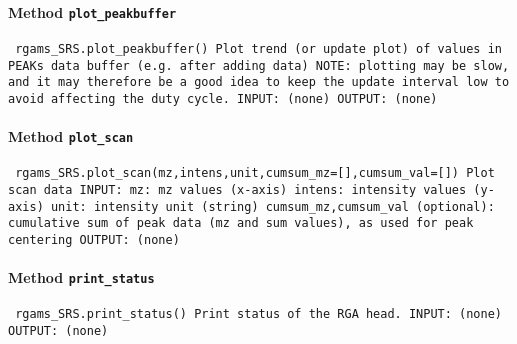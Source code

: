 \paragraph{Method \texttt{plot_peakbuffer}}
\vspace{1ex}
\texttt{\newline
rgams_SRS.plot_peakbuffer()\newline
\newline
Plot trend (or update plot) of values in PEAKs data buffer (e.g. after adding data)\newline
NOTE: plotting may be slow, and it may therefore be a good idea to keep the update interval low to avoid affecting the duty cycle.\newline
\newline
INPUT:\newline
(none)\newline
\newline
OUTPUT:\newline
(none)\newline
\newline
}

\paragraph{Method \texttt{plot_scan}}
\vspace{1ex}
\texttt{\newline
rgams_SRS.plot_scan(mz,intens,unit,cumsum_mz=[],cumsum_val=[])\newline
\newline
Plot scan data\newline
\newline
INPUT:\newline
mz: mz values (x-axis)\newline
intens: intensity values (y-axis)\newline
unit: intensity unit (string)\newline
cumsum_mz,cumsum_val (optional): cumulative sum of peak data (mz and sum values), as used for peak centering\newline
\newline
OUTPUT:\newline
(none)\newline
\newline
}

\paragraph{Method \texttt{print_status}}
\vspace{1ex}
\texttt{\newline
rgams_SRS.print_status()\newline
\newline
Print status of the RGA head.\newline
\newline
INPUT:\newline
(none)\newline
\newline
OUTPUT:\newline
(none)\newline
\newline
}

